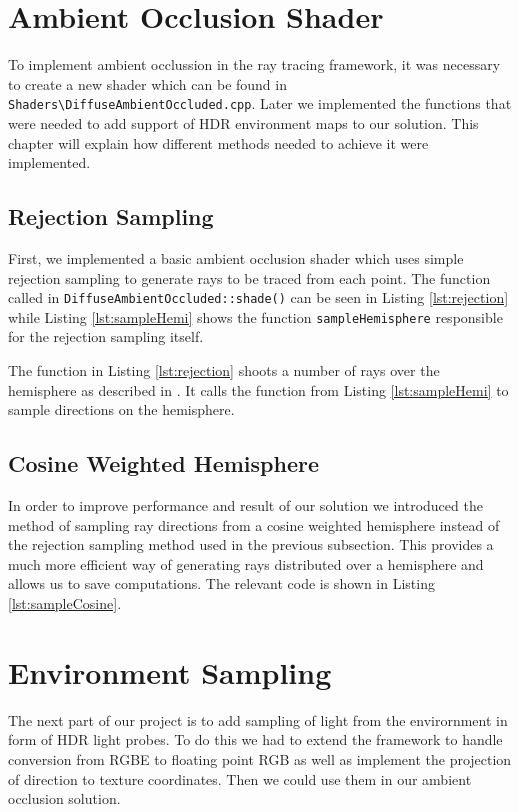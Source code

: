 \section{Ambient Occlusion Shader}
To implement ambient occlussion in the ray tracing framework, it was necessary to create a new shader which can be found in  \texttt{Shaders\textbackslash{}DiffuseAmbientOccluded.cpp}. Later we implemented the functions that were needed to add support of HDR environment maps to our solution. This chapter will explain how different  methods needed to achieve it were implemented.  
\subsection{Rejection Sampling}
First, we implemented a basic ambient occlusion shader which uses simple rejection sampling to generate rays to be traced from each point. The function called in \texttt{DiffuseAmbientOccluded::shade()} can be seen in Listing 		\autoref{lst:rejection} while Listing \autoref{lst:sampleHemi} shows the function \texttt{sampleHemisphere} responsible for the rejection sampling itself.

The function in Listing \autoref{lst:rejection} shoots a number of rays over the hemisphere as described in \cite{Gems17}. It calls the function from Listing \autoref{lst:sampleHemi} to sample directions on the hemisphere.

\subsection{Cosine Weighted Hemisphere}
In order to improve performance and result of our solution we introduced the method of sampling ray directions from a cosine weighted hemisphere instead of the rejection sampling method used in the previous subsection. This provides a much more efficient way of generating rays distributed over a hemisphere and allows us to save computations. The relevant code is shown in Listing \autoref{lst:sampleCosine}.

\section{Environment Sampling}
The next part of our project is to add sampling of light from the envirornment in form of HDR light probes. To do this we had to extend the framework to handle conversion from RGBE to floating point RGB as well as implement the projection of direction to texture coordinates. Then we could use them in our ambient occlusion solution.

